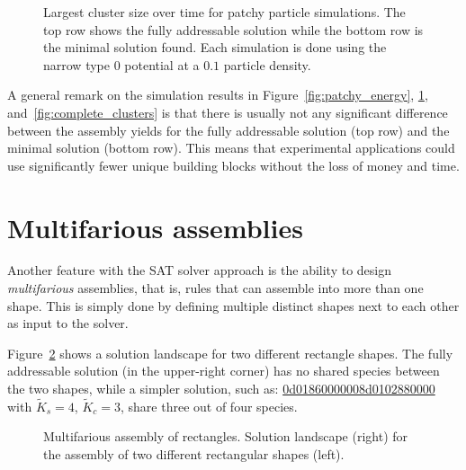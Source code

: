\begin{figure}[ht]
    \centering
    \caption{Largest cluster size over time for patchy particle simulations. The top row shows the fully addressable solution while the bottom row is the minimal solution found. Each simulation is done using the narrow type \(0\) potential at a \(0.1\) particle density.}
    \label{fig:max_cluster}
\end{figure}



A general remark on the simulation results in Figure~\ref{fig:patchy_energy}, \ref{fig:max_cluster}, and~\ref{fig:complete_clusters} is that there is usually not any significant difference between the assembly yields for the fully addressable solution (top row) and the minimal solution (bottom row). This means that experimental applications could use significantly fewer unique building blocks without the loss of money and time.

\section{Multifarious assemblies}

Another feature with the SAT solver approach is the ability to design \emph{multifarious} assemblies, that is, rules that can assemble into more than one shape. This is simply done by defining multiple distinct shapes next to each other as input to the solver.

Figure~\ref{fig:multifarious_rectangles} shows a solution landscape for two different rectangle shapes. The fully addressable solution (in the upper-right corner) has no shared species between the two shapes, while a simpler solution, such as: \href{https://akodiat.github.io/polycubes/?assemblyMode=stochastic&rule=0d01860000000501860000000905020000008d0102880000}{0d0186000000\allowbreak8d0102880000}
with \(\widetilde{K}_s=4\), \(\widetilde{K}_c=3\), share three out of four species.

\begin{figure}[ht]
    \centering
    \caption{Multifarious assembly of rectangles. Solution landscape (right) for the assembly of two different rectangular shapes (left).}
    \label{fig:multifarious_rectangles}
\end{figure}